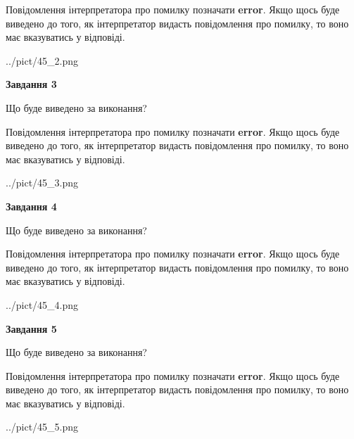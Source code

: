 \documentclass[12pt, ukrainian]{article}
\begin{document}
{\begin {large}
Повідомлення інтерпретатора про помилку позначати \textbf{error}.
Якщо щось буде виведено до того, як інтерпретатор видасть повідомлення про помилку, 
то воно має вказуватись у відповіді. \par


\begin{center}
	{../pict/45_2.png}
\end{center}
\newpage

{\begin {center}\textbf{Завдання 3}\end {center}}\par
Що буде виведено за виконання?

Повідомлення інтерпретатора про помилку позначати \textbf{error}.
Якщо щось буде виведено до того, як інтерпретатор видасть повідомлення про помилку, 
то воно має вказуватись у відповіді. \par


\begin{center}
	{../pict/45_3.png}
\end{center}
\newpage

{\begin {center}\textbf{Завдання 4}\end {center}}\par
Що буде виведено за виконання?

Повідомлення інтерпретатора про помилку позначати \textbf{error}.
Якщо щось буде виведено до того, як інтерпретатор видасть повідомлення про помилку, 
то воно має вказуватись у відповіді. \par


\begin{center}
	{../pict/45_4.png}
\end{center}
\newpage

{\begin {center}\textbf{Завдання 5}\end {center}}\par
Що буде виведено за виконання?

Повідомлення інтерпретатора про помилку позначати \textbf{error}.
Якщо щось буде виведено до того, як інтерпретатор видасть повідомлення про помилку, 
то воно має вказуватись у відповіді. \par


\begin{center}
	{../pict/45_5.png}
\end{center}
\newpage


\end{large}}
\end{document}
